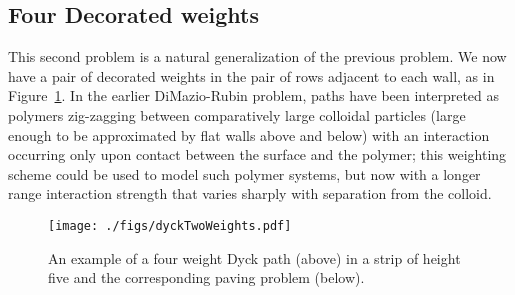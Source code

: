 \documentclass[11pt,a4paper]{article}
\begin{document}

\subsection{Four Decorated weights}	%


This second problem is a natural generalization of the previous problem.  We now have a pair of decorated  weights in the pair of rows adjacent to each wall, as in Figure~\ref{fig:dyckTwoWeights}.
In the earlier DiMazio-Rubin problem, paths have been interpreted as polymers zig-zagging between comparatively large colloidal particles (large enough to be approximated by flat walls above and below) with an interaction occurring only upon contact between the surface and the polymer; this weighting scheme could be used to model such polymer systems, but now with a longer range interaction strength that varies sharply with separation from the colloid.
\begin{figure}[htbp]
\begin{center}
\texttt{[image: ./figs/dyckTwoWeights.pdf]}
\caption{An example of a four weight Dyck path (above) in a strip of height five and the corresponding paving problem (below).}
\label{fig:dyckTwoWeights}
\end{center}
\end{figure}
%
\end{document}
